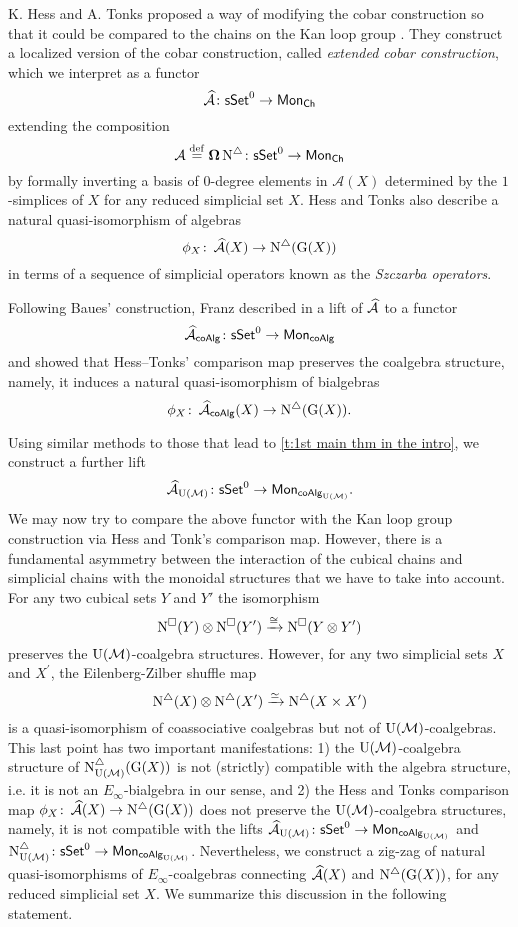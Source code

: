 K. Hess and A. Tonks proposed a way of modifying the cobar construction so that it could be compared to the chains on the Kan loop group \cite{hess2010cobar}.
They construct a localized version of the cobar construction, called \textit{extended cobar construction}, which we interpret as a functor
\[
\operatorname{\mathcal{\widehat{A}}} \colon \mathsf{sSet}^0 \to \mathsf{Mon}_{\mathsf{Ch}}
\]
extending the composition
\[
\operatorname{\mathcal{A}} \stackrel{\mathrm{def}}{=} \operatorname{\mathbf{\Omega}} \operatorname{N^{\triangle}} \colon \mathsf{sSet}^0 \to \mathsf{Mon}_{\mathsf{Ch}}
\]
by formally inverting a basis of $0$-degree elements in $\mathcal{A}(X)$ determined by the $1$-simplices of $X$ for any reduced simplicial set $X$.
Hess and Tonks also describe a natural quasi-isomorphism of algebras
\[
\phi_X \colon \operatorname{\mathcal{\widehat{A}}}(X) \to \operatorname{N^{\triangle}}(\operatorname{G}(X))
\]
in terms of a sequence of simplicial operators known as the \textit{Szczarba operators}.

Following Baues’ construction, Franz described in \cite{franz2020szczarba} a lift of $\operatorname{\mathcal{\widehat{A}}}$ to a functor
\[
\operatorname{\mathcal{\widehat{A}}}_{\mathsf{coAlg}} \colon \mathsf{sSet}^0 \to \mathsf{Mon}_{\mathsf{coAlg}}
\]
and showed that Hess--Tonks' comparison map preserves the coalgebra structure, namely, it induces a natural quasi-isomorphism of bialgebras
\[
\phi_X \colon \operatorname{\mathcal{\widehat{A}}}_{\mathsf{coAlg}}(X) \to \operatorname{N^{\triangle}} (\operatorname{G}(X)).
\]

Using similar methods to those that lead to \cref{t:1st main thm in the intro}, we construct a further lift
\[
\operatorname{\mathcal{\widehat{A}}}_{\operatorname{U}(\mathcal{M})} \colon \mathsf{sSet}^0 \to \mathsf{Mon}_{\mathsf{coAlg}_{\operatorname{U}(\mathcal{M})}}.
\]
We may now try to compare the above functor with the Kan loop group construction via Hess and Tonk's comparison map.
However, there is a fundamental asymmetry between the interaction of the cubical chains and simplicial chains with the monoidal structures that we have to take into account.
For any two cubical sets $Y$ and $Y'$ the isomorphism
\[
\operatorname{N^{\square}}(Y) \otimes \operatorname{N^{\square}}(Y') \xrightarrow{\cong} \operatorname{N^{\square}}(Y \otimes Y')
\]
preserves the ${\operatorname{U}(\mathcal{M})}$-coalgebra structures.
However, for any two simplicial sets $X$ and $X^\prime$, the Eilenberg-Zilber shuffle map
\[
\operatorname{N^{\triangle}}(X) \otimes \operatorname{N^{\triangle}}(X^\prime) \xrightarrow{\simeq} \operatorname{N^{\triangle}}(X \times X^\prime)
\]
is a quasi-isomorphism of coassociative coalgebras but not of ${\operatorname{U}(\mathcal{M})}$-coalgebras.
This last point has two important manifestations: 1) the ${\operatorname{U}(\mathcal{M})}$-coalgebra structure of $\operatorname{N^{\triangle}_{{\operatorname{U}(\mathcal{M})}}}(\operatorname{G}(X))$ is not (strictly) compatible with the algebra structure, i.e. it is not an $E_{\infty}$-bialgebra in our sense, and 2) the Hess and Tonks comparison map $\phi_X \colon \operatorname{\mathcal{\widehat{A}}}(X) \to \operatorname{N^{\triangle}}(\operatorname{G}(X))$ does not preserve the ${\operatorname{U}(\mathcal{M})}$-coalgebra structures, namely, it is not compatible with the lifts $\operatorname{\mathcal{\widehat{A}}}_{\operatorname{U}(\mathcal{M})} \colon \mathsf{sSet}^0 \to \mathsf{Mon}_{\mathsf{coAlg}_{\operatorname{U}(\mathcal{M})}}$
and $\operatorname{N^{\triangle}_{{\operatorname{U}(\mathcal{M})}}} \colon \mathsf{sSet}^0 \to \mathsf{Mon}_{\mathsf{coAlg}_{\operatorname{U}(\mathcal{M})}}$.
Nevertheless, we construct a zig-zag of natural quasi-isomorphisms of $E_{\infty}$-coalgebras connecting $\operatorname{\mathcal{\widehat{A}}}(X)$ and $\operatorname{N^{\triangle}}(\operatorname{G}(X))$, for any reduced simplicial set $X$.
We summarize this discussion in the following statement.

